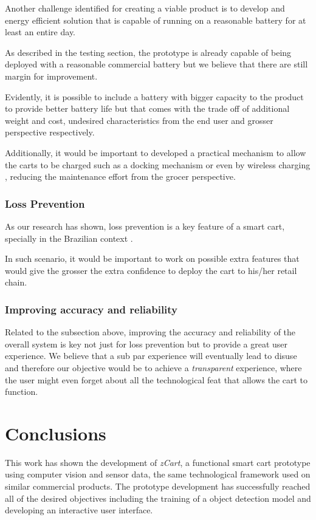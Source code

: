 \documentclass[openright]{normas-utf-tex} %
\begin{document}
Another challenge identified for creating a viable product is to develop and
energy efficient solution that is capable of running on a reasonable battery
for at least an entire day.

As described in the testing section, the prototype is already capable of being
deployed with a reasonable commercial battery but we believe that there are
still margin for improvement.

Evidently, it is possible to include a battery with bigger capacity to the
product to provide better battery life but that comes with the trade off of
additional weight and cost, undesired characteristics from the end user and
grosser perspective respectively.

Additionally, it would be important to developed a practical mechanism to allow
the carts to be charged such as a docking mechanism or even by wireless
charging \cite{Treffers2015}, reducing the maintenance effort from the grocer
perspective. 

\subsection{Loss Prevention}

As our research has shown, loss prevention is a key feature of a smart cart, specially in the Brazilian context
\cite{Nextop2022}.

In such scenario, it would be important to work on possible extra features that
would give the grosser the extra confidence to deploy the cart to his/her retail
chain.

\subsection{Improving accuracy and reliability}

Related to the subsection above, improving the accuracy and reliability of the
overall system is key not just for loss prevention but to provide a great user
experience. We believe that a sub par experience will eventually lead to disuse
and therefore our objective would be to achieve a \textit{transparent}
experience, where the user might even forget about all the technological feat
that allows the cart to function.

\chapter{Conclusions}

This work has shown the development of \textit{zCart}, a functional smart cart
prototype using computer vision and sensor data, the same technological
framework used on similar commercial products. The prototype development has
successfully reached all of the desired objectives including the training of a
object detection model and developing an interactive user interface.
\end{document}
